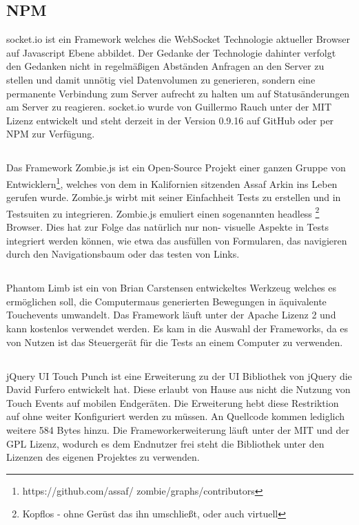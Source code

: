 	\subsection{NPM }
	socket.io ist ein Framework welches die WebSocket Technologie aktueller Browser auf Javascript Ebene abbildet. Der Gedanke 	der Technologie dahinter verfolgt den Gedanken nicht in regelmäßigen Abständen Anfragen an den Server zu stellen und damit 	unnötig viel Datenvolumen zu generieren, sondern eine permanente Verbindung zum Server aufrecht zu halten um auf 			Statusänderungen am Server zu reagieren. socket.io wurde von Guillermo Rauch unter der MIT Lizenz entwickelt und steht 		derzeit in der Version 0.9.16 auf GitHub oder per NPM zur Verfügung.
	
	\subsection{}
	Das Framework Zombie.js ist ein Open-Source Projekt einer ganzen Gruppe von Entwicklern\footnote{https://github.com/assaf/	zombie/graphs/contributors}, welches von dem in Kalifornien sitzenden Assaf Arkin ins Leben gerufen wurde. Zombie.js wirbt mit 	seiner Einfachheit Tests zu erstellen und in Testsuiten zu integrieren. Zombie.js emuliert einen sogenannten headless			\footnote{Kopflos - ohne Gerüst das ihn umschließt, oder auch virtuell} Browser. Dies hat zur Folge das natürlich nur non-		visuelle Aspekte in Tests integriert werden können, wie etwa das ausfüllen von Formularen, das navigieren durch den 			Navigationsbaum oder das testen von Links.

	\subsection{}
	Phantom Limb ist ein von Brian Carstensen entwickeltes Werkzeug welches es ermöglichen soll, die Computermaus generierten 	Bewegungen in äquivalente Touchevents umwandelt. Das Framework läuft unter der Apache Lizenz 2 und kann kostenlos 		verwendet werden. Es kam in die Auswahl der Frameworks, da es von Nutzen ist das Steuergerät für die Tests an einem 			Computer zu verwenden.
	
	\subsection{}
	jQuery UI Touch Punch ist eine Erweiterung zu der UI Bibliothek von jQuery die David Furfero entwickelt hat. Diese erlaubt von 	Hause aus nicht die Nutzung von Touch Events auf mobilen Endgeräten. Die Erweiterung hebt diese Restriktion auf ohne weiter 	Konfiguriert werden zu müssen. An Quellcode kommen lediglich weitere 584 Bytes hinzu. Die Frameworkerweiterung läuft unter 	der MIT und der GPL Lizenz, wodurch es dem Endnutzer frei steht die Bibliothek unter den Lizenzen des eigenen Projektes zu 		verwenden.
	
